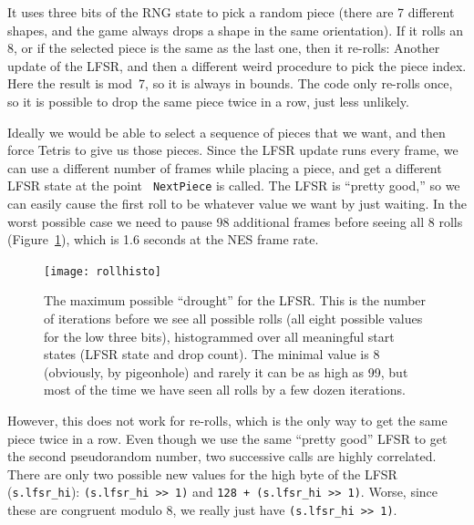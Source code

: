 \documentclass[twocolumn]{article}
\begin{document}
It uses three bits of the RNG state to pick a random piece (there are
7 different shapes, and the game always drops a shape in the same
orientation). If it rolls an 8, or if the selected piece is the same
as the last one, then it re-rolls: Another update of the LFSR, and
then a different weird procedure to pick the piece index. Here the
result is {\sf mod}~7, so it is always in bounds. The code only
re-rolls once, so it is possible to drop the same piece twice in
a row, just less unlikely.

Ideally we would be able to select a sequence of pieces that we want,
and then force Tetris to give us those pieces. Since the LFSR update
runs every frame, we can use a different number of frames while
placing a piece, and get a different LFSR state at the point {\tt
  NextPiece} is called. The LFSR is ``pretty good,'' so we can easily
cause the first roll to be whatever value we want by just waiting. In
the worst possible case we need to pause 98 additional frames before
seeing all 8 rolls (Figure~\ref{fig:rollhisto}), which is 1.6 seconds
at the NES frame rate.

\begin{figure}
  \centering
  \texttt{[image: rollhisto]}
  \caption {
    The maximum possible ``drought'' for the LFSR. This is
    the number of iterations before we see all possible rolls (all
    eight possible values for the low three bits), histogrammed
    over all meaningful start states (LFSR state and drop count).
    The minimal value is 8 (obviously, by pigeonhole) and rarely
    it can be as high as 99, but most of the time we have seen
    all rolls by a few dozen iterations.
    } \label{fig:rollhisto}
\end{figure}

However, this does not work for re-rolls, which is the only way to get
the same piece twice in a row. Even though we use the same ``pretty
good'' LFSR to get the second pseudorandom number, two successive
calls are highly correlated. There are only two possible new values
for the high byte of the LFSR (\verb|s.lfsr_hi|):
\verb|(s.lfsr_hi >> 1)| and \verb|128 + (s.lfsr_hi >> 1)|. Worse,
since these are congruent modulo $8$, we really just have
\verb|(s.lfsr_hi >> 1)|.
 
\end{document}
